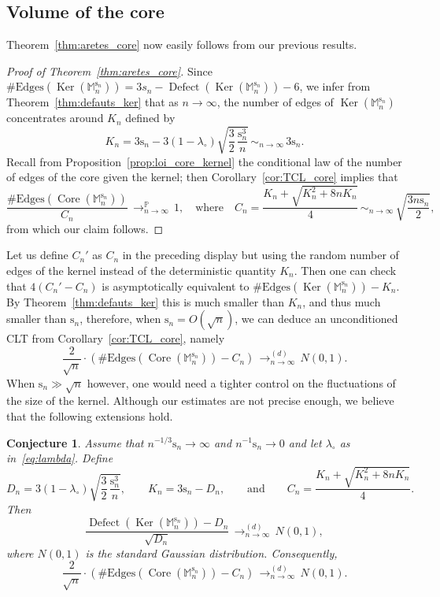 \documentclass[10pt]{amsart}
\theoremstyle{plain}
\newtheorem{conjecture}[theorem]{Conjecture}
\theoremstyle{definition}
\theoremstyle{remark}
\renewcommand{\P}{\mathbb{P}}
\newcommand{\Mapb}{\mathbb{M}}
\newcommand{\spar}{\mathrm{s}}
\DeclareMathOperator{\Core}{Core}
\DeclareMathOperator{\Ker}{Ker}
\DeclareMathOperator{\Defect}{Defect}
\newcommand{\cvloi}[1][n]{\,\mathop{\longrightarrow}^{(d)}_{#1 \to \infty}\,}
\newcommand{\cvproba}[1][n]{\,\mathop{\longrightarrow}^{\P}_{#1 \to \infty}\,}
\newcommand{\equi}[1][n]{\,\mathop{\sim}^{}_{#1 \to \infty}\,}
\begin{document}
\subsection{Volume of the core}
\label{ssec:vol_core}

Theorem~\ref{thm:aretes_core} now easily follows from our previous results.

\begin{proof}[Proof of Theorem~\ref{thm:aretes_core}]
Since $\#\mathrm{Edges} (\Ker(\Mapb_n^{\spar_{n}}))=3s_{n}-\Defect(\Ker(\Mapb_n^{\spar_{n}})) -6$, we infer from Theorem~\ref{thm:defauts_ker} that as $n\to\infty$, the number of edges of $\Ker(\Mapb_n^{\spar_{n}})$ concentrates around $K_{n}$ defined by\vspace*{-3pt}
\[
K_n = 3\spar_n - 3 (1-\lambda_{\circ}) \sqrt{\frac{3}{2}\, \frac{\spar_n^3}{n}} \equi 3\spar_n.
\]
Recall from Proposition~\ref{prop:loi_core_kernel} the conditional law of the number of edges of the core given the kernel; then Corollary~\ref{cor:TCL_core} implies that\vspace*{-3pt}
\[
\frac{\#\mathrm{Edges}(\Core(\Mapb_n^{\spar_{n}}))}{C_n} \cvproba 1,
\quad\text{where}\quad
C_n = \frac{K_n + \sqrt{K_n^{2} + 8 n K_n }}{4}
\equi \sqrt{\frac{3 n \spar_n}{2}},
\]
from which our claim follows.
\end{proof}

Let us define $C_n'$ as $C_n$ in the preceding display but using the random number of edges of the kernel instead of the deterministic quantity $K_n$. Then one can check that $4(C_n' - C_n)$ is asymptotically equivalent to $\#\mathrm{Edges}(\Ker(\Mapb_n^{\spar_{n}}))-K_n$. By Theorem~\ref{thm:defauts_ker} this is much smaller than $K_n$, and thus much smaller than $\spar_n$, therefore, when $\spar_n = O(\sqrt{n})$, we can deduce an unconditioned CLT from Corollary~\ref{cor:TCL_core}, namely
\[
\frac{2}{\sqrt{n}} \cdot \left(\#\mathrm{Edges}(\Core(\Mapb_n^{\spar_{n}})) - C_n \right) \cvloi N(0,1).
\]
When $\spar_n \gg \sqrt{n}$ however, one would need a tighter control on the fluctuations of the size of the kernel.
Although our estimates are not precise enough, we believe that the following extensions hold.

\begin{conjecture}\label{conjecture_TCL}
Assume that $n^{-1/3} \spar_n \to \infty$ and $n^{-1} \spar_n \to 0$ and let $\lambda_\circ$ as in~\eqref{eq:lambda}. Define
\[
D_n = 3 (1-\lambda_{\circ}) \sqrt{\frac{3}{2}\, \frac{\spar_n^3}{n}},
\qquad
K_n = 3\spar_n - D_n,
\qquad\text{and}\qquad
C_n = \frac{K_n + \sqrt{K_n^{2} + 8 n K_n }}{4}.
\]
Then
\[
\frac{\Defect(\Ker(\Mapb_n^{\spar_{n}})) - D_n}{\sqrt{D_n}} \cvloi N(0,1),
\]
where $N(0,1)$ is the standard Gaussian distribution. Consequently,
\[
\frac{2}{\sqrt{n}} \cdot \left(\#\mathrm{Edges}(\Core(\Mapb_n^{\spar_{n}})) - C_n \right) \cvloi N(0,1).
\]
\end{conjecture}
\end{document}
